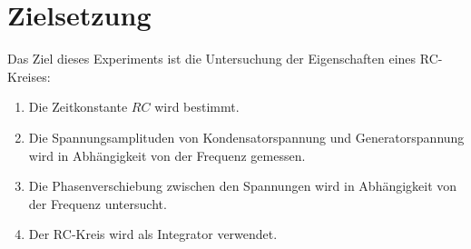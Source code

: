\section{Zielsetzung}
\label{sec:Zielsetzung}


Das Ziel dieses Experiments ist die Untersuchung der Eigenschaften eines RC-Kreises:
\begin{enumerate}[label=\alph*)]
    \item Die Zeitkonstante $RC$ wird bestimmt.
    \item Die Spannungsamplituden von Kondensatorspannung und Generatorspannung wird in Abhängigkeit von der Frequenz gemessen.
    \item Die Phasenverschiebung zwischen den Spannungen wird in Abhängigkeit von der Frequenz untersucht.
    \item Der RC-Kreis wird als Integrator verwendet.
\end{enumerate}